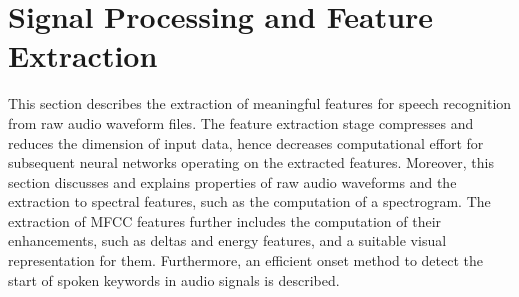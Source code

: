 
\chapter{Signal Processing and Feature Extraction}\label{sec:signal}
This section describes the extraction of meaningful features for speech recognition from raw audio waveform files.
The feature extraction stage compresses and reduces the dimension of input data, hence decreases computational effort for subsequent neural networks operating on the extracted features.
Moreover, this section discusses and explains properties of raw audio waveforms and the extraction to spectral features, such as the computation of a spectrogram. 
The extraction of MFCC features further includes the computation of their enhancements, such as deltas and energy features, and a suitable visual representation for them.
Furthermore, an efficient onset method to detect the start of spoken keywords in audio signals is described.





